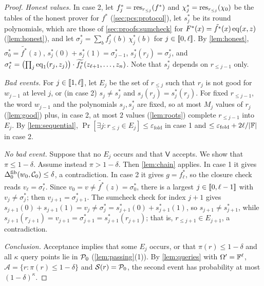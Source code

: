 \begin{proof}
\emph{Honest values.} In case 2, let $f^*_j = \mathrm{res}_{r_{\le j}}(f^*)$ and $\chi^*_j = \mathrm{res}_{r_{\le j}}(\chi_0)$ be the tables of the honest prover for $f^*$ (\cref{sec:pcs:protocol}), let $s^*_j$ be its round polynomials, which are those of \cref{sec:proofs:sumcheck} for $F^*(x) = \tilde{f^*}(x)\,\mathrm{eq}(x,z)$ (\cref{lem:honest}), and let $\sigma^*_j = \sum_b f^*_j(b)\,\chi^*_j(b)$ for $j \in \llbracket 0, \ell \rrbracket$.
By \cref{lem:honest}, $\sigma^*_0 = \tilde{f^*}(z)$, $s^*_j(0) + s^*_j(1) = \sigma^*_{j-1}$, $s^*_j(r_j) = \sigma^*_j$, and $\sigma^*_\ell = \bigl(\prod_{j}\mathrm{eq}_1(r_j,z_j)\bigr)\cdot\widetilde{f^*_\ell}(z_{\ell+1},\dots,z_n)$.
Note that $s^*_j$ depends on $r_{\le j-1}$ only.

\emph{Bad events.} For $j \in \llbracket 1, \ell \rrbracket$, let $E_j$ be the set of $r_{\le j}$ such that $r_j$ is not good for $w_{j-1}$ at level $j$, or (in case 2) $s_j \ne s^*_j$ and $s_j(r_j) = s^*_j(r_j)$.
For fixed $r_{\le j-1}$, the word $w_{j-1}$ and the polynomials $s_j, s^*_j$ are fixed, so at most $M_j$ values of $r_j$ (\cref{lem:good}) plus, in case 2, at most $2$ values (\cref{lem:roots}) complete $r_{\le j-1}$ into $E_j$.
By \cref{lem:sequential}, $\Pr[\exists j : r_{\le j} \in E_j] \le \varepsilon_{\mathrm{fold}}$ in case 1 and $\le \varepsilon_{\mathrm{fold}} + 2\ell/|\mathbb{F}|$ in case 2.

\emph{No bad event.} Suppose that no $E_j$ occurs and that $\mathsf{V}$ accepts. We show that $\pi \le 1-\delta$.
Assume instead $\pi > 1-\delta$. Then \cref{lem:chain} applies. In case 1 it gives $\Delta^{\mathrm{fib}}_0(w_0,\mathcal{C}_0) \le \delta$, a contradiction.
In case 2 it gives $g = f^*_\ell$, so the closure check reads $v_\ell = \sigma^*_\ell$.
Since $v_0 = v \ne \tilde{f^*}(z) = \sigma^*_0$, there is a largest $j \in \llbracket 0, \ell-1 \rrbracket$ with $v_j \ne \sigma^*_j$; then $v_{j+1} = \sigma^*_{j+1}$.
The sumcheck check for index $j+1$ gives $s_{j+1}(0) + s_{j+1}(1) = v_j \ne \sigma^*_j = s^*_{j+1}(0) + s^*_{j+1}(1)$, so $s_{j+1} \ne s^*_{j+1}$, while $s_{j+1}(r_{j+1}) = v_{j+1} = \sigma^*_{j+1} = s^*_{j+1}(r_{j+1})$; that is, $r_{\le j+1} \in E_{j+1}$, a contradiction.

\emph{Conclusion.} Acceptance implies that some $E_j$ occurs, or that $\pi(r) \le 1-\delta$ and all $\kappa$ query points lie in $\mathcal{P}_0$ (\cref{lem:passing}(1)).
By \cref{lem:queries} with $\Omega' = \mathbb{F}^\ell$, $\mathcal{A} = \{r : \pi(r) \le 1-\delta\}$ and $\mathcal{S}(r) = \mathcal{P}_0$, the second event has probability at most $(1-\delta)^\kappa$.
\end{proof}

